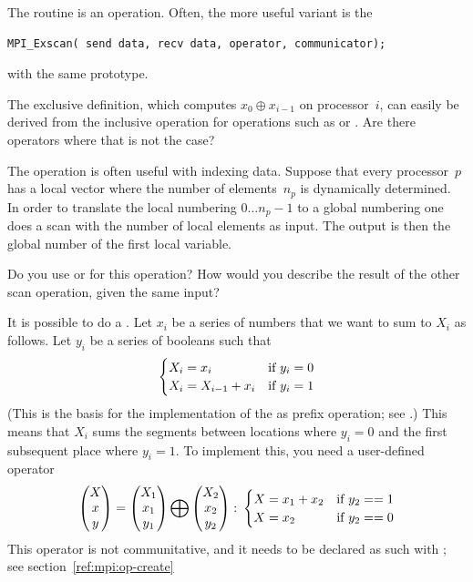 The  routine is an  operation.
Often, the more useful variant is the 
\begin{verbatim}
MPI_Exscan( send data, recv data, operator, communicator);
\end{verbatim}
with the same prototype. 

\begin{exercise}
  The exclusive definition, which computes
  $x_0\oplus x_{i-1}$ on processor~$i$, can easily be derived
  from the inclusive operation for operations such as  or .
  Are there operators where that is not the case?
\end{exercise}

The  operation is often useful with indexing data. Suppose that
every processor~$p$ has a local vector where the number of elements~$n_p$ is dynamically 
determined. In order to translate the local numbering $0\ldots n_p-1$ to a global numbering
one does a scan with the number of local elements as input. The output is then the global 
number of the first local variable.

\begin{exercise}
  Do you use  or  for this operation? How
  would you describe the result of the other scan operation, given the
  same input?
\end{exercise}

It is possible to do a . Let $x_i$ be a series of numbers
that we want to sum to $X_i$ as follows. Let $y_i$ be a series of booleans such that
\[ 
\begin{cases}
  X_i=x_i&\hbox{if $y_i=0$}\\
  X_i=X_{i-1}+x_i&\hbox{if $y_i=1$}
\end{cases}
\]
(This is the basis for the implementation of the 
as prefix operation; see .)
This means that $X_i$ sums the segments between locations where $y_i=0$ and the
first subsequent place where $y_i=1$. To implement this, you need a user-defined operator
\[ 
\begin{pmatrix}  X\\ x\\ y\end{pmatrix}
=
\begin{pmatrix}  X_1\\ x_1\\ y_1\end{pmatrix}
\bigoplus
\begin{pmatrix}  X_2\\ x_2\\ y_2\end{pmatrix}\colon
  \begin{cases}
    X=x_1+x_2&\hbox{if $y_2==1$}\\ X=x_2&\hbox{if $y_2==0$}
  \end{cases}
\]
This operator is not communitative, and it needs to be declared as such
with ; see section~\ref{ref:mpi:op-create}

